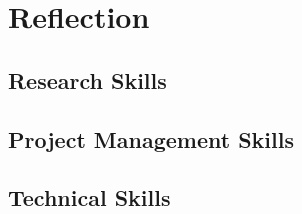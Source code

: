 \chapter{Reflection} 

\section{Research Skills}

\section{Project Management Skills}

\section{Technical Skills}
